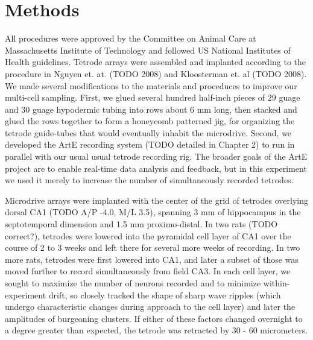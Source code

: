 \documentclass[10pt]{article}
\begin{document}
\cite{Mizuseki 2012}


\section*{Methods}
All procedures were approved by the Committee on Animal Care at Massachusetts Institute of Technology and followed US National Institutes of Health guidelines. Tetrode arrays were assembled and implanted  according to the procedure in Nguyen et. at. (TODO 2008) and Kloosterman et. al (TODO 2008). We made several modifications to the materials and proceduces to improve our multi-cell sampling.  First, we glued several hundred half-inch pieces of 29 guage and 30 guage hypodermic tubing into rows about 6 mm long, then stacked and glued the rows together to form a honeycomb patterned jig, for organizing the tetrode guide-tubes that would eventually inhabit the microdrive. Second, we developed the ArtE recording system (TODO detailed in Chapter 2) to run in parallel with our usual usual tetrode recording rig. The broader goals of the ArtE project are to enable real-time data analysis and feedback, but in this experiment we used it merely to increase the number of simultaneously recorded tetrodes.

Microdrive arrays were implanted with the center of the grid of tetrodes overlying dorsal CA1 (TODO A/P -4.0, M/L 3.5), spanning 3 mm of hippocampus in the septotemporal dimension and 1.5 mm proximo-distal. In two rats (TODO correct?), tetrodes were lowered into the pyramidal cell layer of CA1 over the course of 2 to 3 weeks and left there for several more weeks of recording.  In two more rats, tetrodes were first lowered into CA1, and later a subset of those was moved further to record simultaneously from field CA3. In each cell layer, we sought to maximize the number of neurons recorded and to minimize within-experiment drift, so closely tracked the shape of sharp wave ripples (which undergo characteristic changes during approach to the cell layer) and later the amplitudes of burgeoning clusters. If either of these factors changed overnight to a degree greater than expected, the tetrode was retracted by 30 - 60 micrometers.
\end{document}
